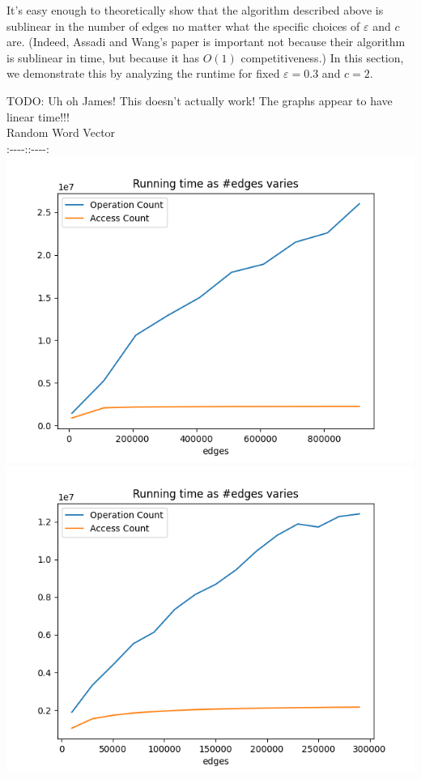 \documentclass[
]{article}
\begin{document}
It's easy enough to theoretically show that the
algorithm described above is sublinear in the number of edges no matter
what the specific choices of {\(\varepsilon\)} and {\(c\)} are. (Indeed,
Assadi and Wang's paper is important not because their
algorithm is sublinear in time, but because it has {\(O(1)\)}
competitiveness.) In this section, we demonstrate this by analyzing the
runtime for fixed {\(\varepsilon = 0.3\)} and {\(c = 2\)}.

TODO: Uh oh James! This doesn't actually work! The
graphs appear to have linear time!!!\\
Random \textbar{} Word Vector\\
:-\/-\/-\/-:\textbar:-\/-\/-\/-:\\
\includegraphics{images/running_time_as_edges_varies.png}
\textbar{}
\includegraphics{images/running_time_as_edges_varies_word_vector.png}
\end{document}
